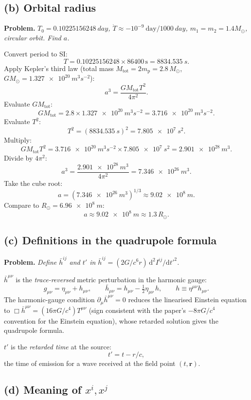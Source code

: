 \documentclass[11pt]{article}
\newcommand{\de}{\mathrm{d}}
\begin{document}
\subsection*{(b) Orbital radius}

\textbf{Problem.} \emph{$T_0 = \SI{0.10225156248}{day}$, $\dot T \approx -10^{-9}\ \mathrm{day}/\SI{1000}{day}$, $m_1 = m_2 = 1.4 M_\odot$, circular orbit. Find $a$.}

Convert period to SI:
\[
T = 0.10225156248\times 86400\,\mathrm{s} = \SI{8834.535}{s}.
\]
Apply Kepler's third law (total mass $M_{\mathrm{tot}} = 2 m_{\mathrm p} = 2.8\,M_\odot$, $G M_\odot = \SI{1.327e20}{m^3 s^{-2}}$):
\[
a^3 = \frac{G M_{\mathrm{tot}} T^2}{4\pi^2}.
\]
Evaluate $G M_{\mathrm{tot}}$:
\[
G M_{\mathrm{tot}} = 2.8\times \SI{1.327e20}{m^3 s^{-2}} = \SI{3.716e20}{m^3 s^{-2}}.
\]
Evaluate $T^2$:
\[
T^2 = (\SI{8834.535}{s})^2 = \SI{7.805e7}{s^2}.
\]
Multiply:
\[
G M_{\mathrm{tot}} T^2 = \SI{3.716e20}{m^3 s^{-2}}\times\SI{7.805e7}{s^2} = \SI{2.901e28}{m^3}.
\]
Divide by $4\pi^2$:
\[
a^3 = \frac{\SI{2.901e28}{m^3}}{4\pi^2} = \SI{7.346e26}{m^3}.
\]
Take the cube root:
\[
a = (\SI{7.346e26}{m^3})^{1/3} \approx \SI{9.02e8}{m}.
\]
Compare to $R_\odot = \SI{6.96e8}{m}$:
\[
\boxed{\;a \approx \SI{9.02e8}{m} \approx 1.3\,R_\odot.\;}
\]

\subsection*{(c) Definitions in the quadrupole formula}

\textbf{Problem.} \emph{Define $\bar h^{ij}$ and $t'$ in $\bar h^{ij} = (2G/c^6 r)\,\de^2 I^{ij}/\de t'^2$.}

$\bar h^{\mu\nu}$ is the \emph{trace-reversed} metric perturbation in the harmonic gauge:
\[
g_{\mu\nu} = \eta_{\mu\nu} + h_{\mu\nu},\qquad \bar h_{\mu\nu} = h_{\mu\nu} - \tfrac{1}{2}\eta_{\mu\nu}\,h,\qquad h \equiv \eta^{\mu\nu}h_{\mu\nu}.
\]
The harmonic-gauge condition $\partial_\mu\bar h^{\mu\nu} = 0$ reduces the linearised Einstein equation to $\Box\bar h^{\mu\nu} = (16\pi G/c^4)T^{\mu\nu}$ (sign consistent with the paper's $-8\pi G/c^4$ convention for the Einstein equation), whose retarded solution gives the quadrupole formula.

$t'$ is the \emph{retarded time} at the source:
\[
\boxed{\;t' = t - r/c,\;}
\]
the time of emission for a wave received at the field point $(t,\bm r)$.

\subsection*{(d) Meaning of $x^i, x^j$}
\end{document}
